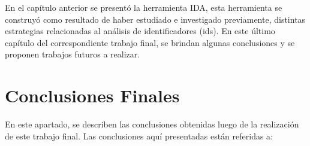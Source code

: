 


En el capítulo anterior se presentó la herramienta IDA, esta herramienta se construyó como resultado de haber estudiado e investigado previamente, distintas estrategias relacionadas al análisis de identificadores (ids). En este último capítulo del correspondiente trabajo final, se brindan algunas conclusiones y se proponen trabajos futuros a realizar.

\section{Conclusiones Finales}

En este apartado, se describen las conclusiones obtenidas luego de la realización de este trabajo final. Las conclusiones aquí presentadas están referidas a:

